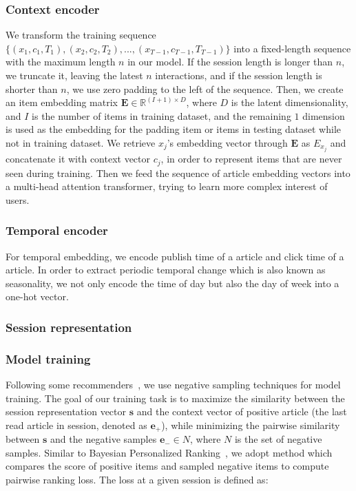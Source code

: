 \subsubsection{Context encoder}
We transform the training sequence $\{(x_1,c_1,T_1),(x_2,c_2,T_2),...,(x_{T-1},c_{T-1},T_{T-1})\}$ into a fixed-length sequence with the maximum length $n$ in our model. If the session length is longer than $n$, we truncate it, leaving the latest $n$ interactions, and if the session length is shorter than $n$, we use zero padding to the left of the sequence. Then, we create an item embedding matrix $\mathbf{E}\in \mathbb{R}^{(I+1)\times D}$, where $D$ is the latent dimensionality, and $I$ is the number of items in training dataset, and the remaining $1$ dimension is used as the embedding for the padding item or items in testing dataset while not in training dataset. We retrieve $x_j$'s embedding vector through $\mathbf{E}$ as $E_{x_j}$ and concatenate it with context vector $c_j$, in order to represent items that are never seen during training. Then we feed the sequence of article embedding vectors into a multi-head attention transformer, trying to learn more complex interest of users. 

\subsubsection{Temporal encoder}
For temporal embedding, we encode publish time of a article and click time of a article. In order to extract periodic temporal change which is also known as seasonality, we not only encode the time of day but also the day of week into a one-hot vector. 

\subsubsection{Session representation}

\subsubsection{Model training}
Following some recommenders~\cite{wu_neural_2019,wu_neural_2019-1}, we use negative sampling techniques for model training. The goal of our training task is to maximize the similarity between the session representation vector $\mathbf{s}$
and the context vector of positive article (the last read article in session, denoted as $\mathbf{e_{+}}$), while minimizing the pairwise similarity between $\mathbf{s}$ and the negative samples $\mathbf{e_{-}}\in N$, where $N$ is the set of negative samples.  Similar to Bayesian Personalized Ranking~\cite{Rendle2009BPR}, we adopt method which compares the score of positive items and sampled negative items to compute pairwise ranking loss. The loss at a given session is defined as: 

